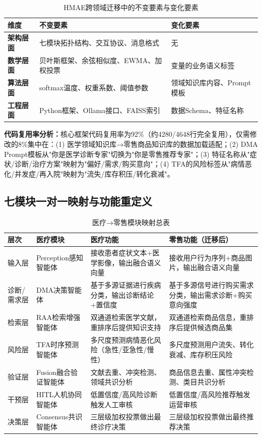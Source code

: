 \documentclass[11pt,a4paper]{ctexart}
\theoremstyle{remark}
\begin{document}
\begin{table}[H]
\centering
\caption{HMAE跨领域迁移中的不变要素与变化要素}
\begin{tabular}{p{4.5cm}|p{5.5cm}|p{5cm}}
\toprule
\textbf{维度} & \textbf{不变要素} & \textbf{变化要素} \\
\midrule
\textbf{架构层面} & 七模块拓扑结构、交互协议、消息格式 & 无 \\
\textbf{数学层面} & 贝叶斯框架、余弦相似度、EWMA、加权投票 & 变量的业务语义标签 \\
\textbf{算法层面} & softmax温度、权重系数、阈值参数 & 领域知识库内容、Prompt模板 \\
\textbf{工程层面} & Python框架、Ollama接口、FAISS索引 & 数据Schema、特征名称 \\
\bottomrule
\end{tabular}
\end{table}

\textbf{代码复用率分析：}核心框架代码复用率为92\%（约4280/4648行完全复用），仅需修改的8\%集中在：(1) 医学领域知识库→零售商品知识库的数据加载适配；(2) DMA Prompt模板从"你是医学诊断专家"切换为"你是零售推荐专家"；(3) 特征名称从"症状/诊断/治疗方案"映射为"偏好/需求/购买意向"；(4) TFA的风险标签从"病情恶化/并发症/再入院"映射为"流失/库存积压/转化衰减"。

\subsection{七模块一对一映射与功能重定义}

\begin{table}[H]
\centering
\caption{医疗→零售模块映射总表}
\small
\begin{tabular}{p{2.2cm}|p{2.2cm}|p{5cm}|p{5cm}}
\toprule
\textbf{层次} & \textbf{医疗模块} & \textbf{医疗功能} & \textbf{零售功能（迁移后）} \\
\midrule
输入层 & Perception感知智能体 & 接收患者症状文本+医学影像，输出融合语义向量 & 接收用户行为序列+商品图片，输出融合语义向量 \\
\midrule
诊断/需求层 & DMA决策智能体 & 基于多源证据进行疾病分类，输出诊断结论+置信度 & 基于多源信号进行购买需求分类，输出需求诊断+购买意向强度 \\
\midrule
检索层 & RAA检索增强智能体 & 双通道检索医学文献，重排序后提供知识支持 & 双通道检索商品信息，重排序后提供候选商品集 \\
\midrule
风险层 & TFA时序预测智能体 & 多尺度预测病情恶化风险（急性/亚急性/慢性） & 多尺度预测用户流失、转化衰减、库存积压风险 \\
\midrule
验证层 & Fusion融合验证智能体 & 文献去重、冲突检测、领域共识分析 & 商品信息去重、属性冲突检测、类目共识分析 \\
\midrule
干预层 & HITL人机协同智能体 & 低置信度/高风险诊断触发人工审核 & 低置信度/高风险推荐触发运营审核 \\
\midrule
决策层 & Consensus共识智能体 & 三层级加权投票做出最终诊疗决策 & 三层级加权投票做出最终推荐决策 \\
\bottomrule
\end{tabular}
\end{table}
\end{document}
